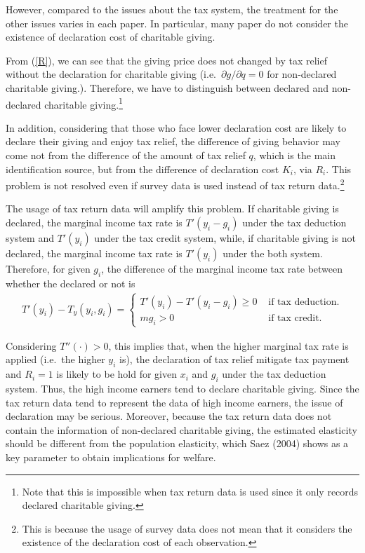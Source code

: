 \documentclass[
  11pt,
  a4paper,
]{article}
\begin{document}
However, compared to the issues about the tax system, the treatment for the other issues varies in each paper. In particular, many paper do not consider the existence of declaration cost of charitable giving.

From (\ref{R}), we can see that the giving price does not changed by tax relief without the declaration for charitable giving (i.e.~\(\partial g/\partial q=0\) for non-declared charitable giving.). Therefore, we have to distinguish between declared and non-declared charitable giving.\footnote{Note that this is impossible when tax return data is used since it only records declared charitable giving.}

In addition, considering that those who face lower declaration cost are likely to declare their giving and enjoy tax relief, the difference of giving behavior may come not from the difference of the amount of tax relief \(q\), which is the main identification source, but from the difference of declaration cost \(K_i\), via \(R_i\).
This problem is not resolved even if survey data is used instead of tax return data.\footnote{This is because the usage of survey data does not mean that it considers the existence of the declaration cost of each observation.}

The usage of tax return data will amplify this problem. If charitable giving is declared, the marginal income tax rate is \(T'(y_i-g_i)\) under the tax deduction system and \(T'(y_i)\) under the tax credit system, while, if charitable giving is not declared, the marginal income tax rate is \(T'(y_i)\) under the both system. Therefore, for given \(g_i\), the difference of the marginal income tax rate between whether the declared or not is
\begin{align}
T'(y_i)-T_y(y_i,g_i)=\begin{cases}
    T'(y_i)-T'(y_i-g_i)\ge0 &\text{ if tax deduction}.\\
    mg_i>0 &\text{ if tax credit}.
\end{cases}
\end{align}

Considering \(T''(\cdot)>0\), this implies that, when the higher marginal tax rate is applied (i.e.~the higher \(y_i\) is), the declaration of tax relief mitigate tax payment and \(R_i=1\) is likely to be hold for given \(x_i\) and \(g_i\) under the tax deduction system. Thus, the high income earners tend to declare charitable giving. Since the tax return data tend to represent the data of high income earners, the issue of declaration may be serious. Moreover, because the tax return data does not contain the information of non-declared charitable giving, the estimated elasticity should be different from the population elasticity, which Saez (2004) shows as a key parameter to obtain implications for welfare.
\end{document}
